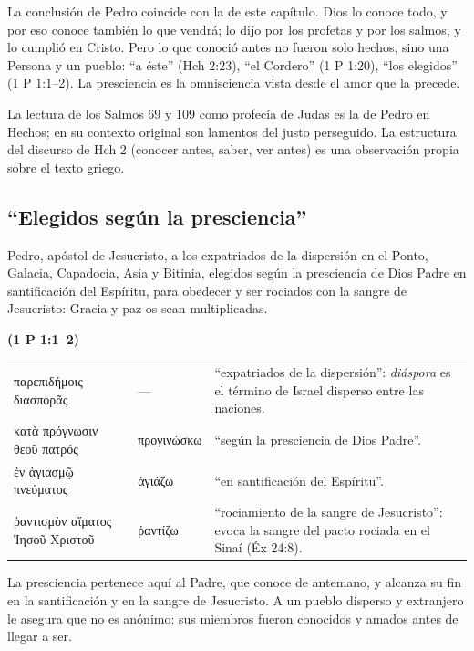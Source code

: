 \documentclass[11pt,letterpaper]{article}
\newcommand{\grc}[1]{\foreignlanguage{ancientgreek}{#1}}
\newcommand{\fuente}[1]{\par\hfill{\upshape\bfseries\small\textcolor{azul}{#1}}}
\begin{document}
La conclusión de Pedro coincide con la de este capítulo. Dios lo conoce todo, y por eso conoce también lo que vendrá; lo dijo por los profetas y por los salmos, y lo cumplió en Cristo. Pero lo que conoció antes no fueron solo hechos, sino una Persona y un pueblo: ``a éste'' (Hch 2:23), ``el Cordero'' (1 P 1:20), ``los elegidos'' (1 P 1:1--2). La presciencia es la omnisciencia vista desde el amor que la precede.

\begin{nota}[Precisión]
La lectura de los Salmos 69 y 109 como profecía de Judas es la de Pedro en Hechos; en su contexto original son lamentos del justo perseguido. La estructura del discurso de Hch 2 (conocer antes, saber, ver antes) es una observación propia sobre el texto griego.
\end{nota}

\subsection{``Elegidos según la presciencia''}

\begin{cita}Pedro, apóstol de Jesucristo, a los expatriados de la dispersión en el Ponto, Galacia, Capadocia, Asia y Bitinia, elegidos según la presciencia de Dios Padre en santificación del Espíritu, para obedecer y ser rociados con la sangre de Jesucristo: Gracia y paz os sean multiplicadas.\fuente{(1 P 1:1--2)}\end{cita}

\begin{filologia}[1 P 1:1--2]
\begin{tabular}{@{}L{3.6cm}L{1.6cm}L{9.6cm}@{}}
\grc{παρεπιδήμοις διασπορᾶς} & --- & ``expatriados de la dispersión'': \emph{diáspora} es el término de Israel disperso entre las naciones. \\[2pt]
\grc{κατὰ πρόγνωσιν θεοῦ πατρός} & \grc{προγινώσκω} & ``según la presciencia de Dios Padre''. \\[2pt]
\grc{ἐν ἁγιασμῷ πνεύματος} & \grc{ἁγιάζω} & ``en santificación del Espíritu''. \\[2pt]
\grc{ῥαντισμὸν αἵματος Ἰησοῦ Χριστοῦ} & \grc{ῥαντίζω} & ``rociamiento de la sangre de Jesucristo'': evoca la sangre del pacto rociada en el Sinaí (Éx 24:8). \\
\end{tabular}
\end{filologia}

La presciencia pertenece aquí al Padre, que conoce de antemano, y alcanza su fin en la santificación y en la sangre de Jesucristo. A un pueblo disperso y extranjero le asegura que no es anónimo: sus miembros fueron conocidos y amados antes de llegar a ser.
\end{document}
